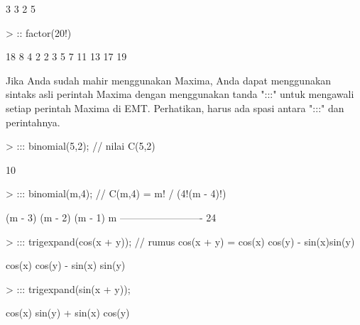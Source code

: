 \documentclass[a4paper,10pt]{article}
\begin{document}
\begin{eulernotebook}
\begin{eulercomment}
\begin{eulercomment}
\begin{euleroutput}
                                   3  3
                                  2  5
  
\end{euleroutput}
\begin{eulerprompt}
> :: factor(20!)
\end{eulerprompt}
\begin{euleroutput}
  
                          18  8  4  2
                         2   3  5  7  11 13 17 19
  
\end{euleroutput}
\begin{eulercomment}
Jika Anda sudah mahir menggunakan Maxima, Anda dapat menggunakan
sintaks asli perintah Maxima dengan menggunakan tanda ":::" untuk
mengawali setiap perintah Maxima di EMT. Perhatikan, harus ada spasi
antara ":::" dan perintahnya.
\end{eulercomment}
\begin{eulerprompt}
> ::: binomial(5,2); // nilai C(5,2)
\end{eulerprompt}
\begin{euleroutput}
  
                                    10
  
\end{euleroutput}
\begin{eulerprompt}
> ::: binomial(m,4); // C(m,4) = m! / (4!(m - 4)!)
\end{eulerprompt}
\begin{euleroutput}
  
                        (m - 3) (m - 2) (m - 1) m
                        -------------------------
                                   24
  
\end{euleroutput}
\begin{eulerprompt}
> ::: trigexpand(cos(x + y)); // rumus cos(x + y) = cos(x) cos(y) - sin(x)sin(y)
\end{eulerprompt}
\begin{euleroutput}
  
                      cos(x) cos(y) - sin(x) sin(y)
  
\end{euleroutput}
\begin{eulerprompt}
> ::: trigexpand(sin(x + y));
\end{eulerprompt}
\begin{euleroutput}
  
                      cos(x) sin(y) + sin(x) cos(y)
  

\end{euleroutput}
\end{eulercomment}
\end{eulercomment}
\end{eulernotebook}
\end{document}
